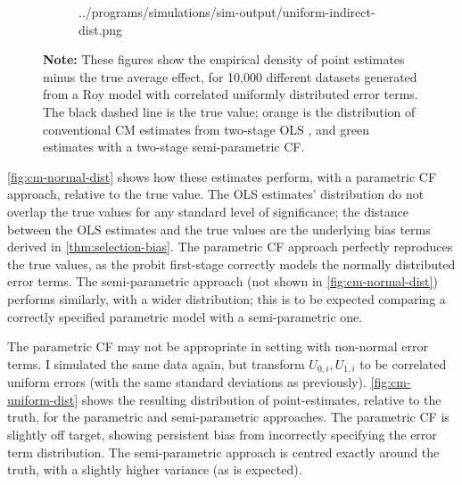 \begin{figure}[h!]
\begin{subfigure}[c]{0.475\textwidth}
{            ../programs/simulations/sim-output/uniform-indirect-dist.png}
    \end{subfigure}
    \label{fig:cm-uniform-dist}
    \justify
    \footnotesize    
    \textbf{Note:}
    These figures show the empirical density of point estimates minus the true average effect, for 10,000 different datasets generated from a Roy model with correlated uniformly distributed error terms.
    The black dashed line is the true value;
    orange is the distribution of conventional CM estimates from two-stage OLS \citep{imai2010identification},
    and green estimates with a two-stage semi-parametric CF.
\end{figure}

\autoref{fig:cm-normal-dist} shows how these estimates perform, with a parametric CF approach, relative to the true value.
The OLS estimates' distribution do not overlap the true values for any standard level of significance; the distance between the OLS estimates and the true values are the underlying bias terms derived in \autoref{thm:selection-bias}.
The parametric CF approach perfectly reproduces the true values, as the probit first-stage correctly models the normally distributed error terms.
The semi-parametric approach (not shown in \autoref{fig:cm-normal-dist}) performs similarly, with a wider distribution; this is to be expected comparing a correctly specified parametric model with a semi-parametric one.

The parametric CF may not be appropriate in setting with non-normal error terms.
I simulated the same data again, but transform $U_{0,i}, U_{1,i}$ to be correlated uniform errors (with the same standard deviations as previously).
\autoref{fig:cm-uniform-dist} shows the resulting distribution of point-estimates, relative to the truth, for the parametric and semi-parametric approaches.
The parametric CF is slightly off target, showing persistent bias from incorrectly specifying the error term distribution.
The semi-parametric approach is centred exactly around the truth, with a slightly higher variance (as is expected).

